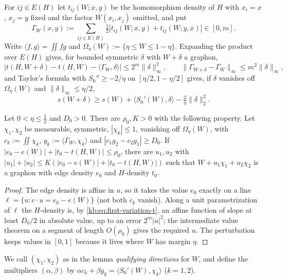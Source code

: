 For $ij\in E(H)$ let $t_{ij}(W;x,y)$ be the homomorphism density of $H$ with
$x_i=x$, $x_j=y$ fixed and the factor $W(x_i,x_j)$ omitted, and put
\[
  \Gamma_W(x,y):=\sum_{ij\in E(H)}\tfrac12\bigl[t_{ij}(W;x,y)+t_{ij}(W;y,x)\bigr]
  \in[0,m].
\]
Write $\langle f,g\rangle=\iint fg$ and $\Omega_\eta(W):=\{\eta\le W\le1-\eta\}$.  Expanding the
product over $E(H)$ gives, for bounded symmetric $\delta$ with $W+\delta$ a graphon,
\begin{equation}\label{kb:eq:first-variation-t}
  \bigl|t(H,W+\delta)-t(H,W)-\langle\Gamma_W,\delta\rangle\bigr|\le 2^m\|\delta\|_\infty^2,
  \qquad
  \|\Gamma_{W+\delta}-\Gamma_W\|_\infty\le m^2\|\delta\|_\infty,
\end{equation}
and Taylor's formula with $S_0''\ge-2/\eta$ on $[\eta/2,1-\eta/2]$ gives, if $\delta$
vanishes off $\Omega_\eta(W)$ and $\|\delta\|_\infty\le\eta/2$,
\begin{equation}\label{kb:eq:first-variation-s}
  s(W+\delta)\ge s(W)+\langle S_0'(W),\delta\rangle-\tfrac2\eta\|\delta\|_2^2 .
\end{equation}

\begin{lemma}\label{kb:lem:correction}
Let $0<\eta\le\frac12$ and $D_0>0$.  There are $\rho_0,K>0$ with the following property.
Let $\chi_1,\chi_2$ be measurable, symmetric, $|\chi_k|\le1$, vanishing off
$\Omega_\eta(W)$, with $c_k:=\iint\chi_k$, $g_k:=\langle\Gamma_W,\chi_k\rangle$ and
$|c_1g_2-c_2g_1|\ge D_0$.  If $|e_0-e(W)|+|t_0-t(H,W)|\le\rho_0$, there are $u_1,u_2$ with
$|u_1|+|u_2|\le K(|e_0-e(W)|+|t_0-t(H,W)|)$ such that $W+u_1\chi_1+u_2\chi_2$ is a graphon
with edge density $e_0$ and $H$-density $t_0$.
\end{lemma}

\begin{proof}
The edge density is affine in $u$, so it takes the value $e_0$ exactly on a line
$\ell=\{u: c\cdot u=e_0-e(W)\}$ (not both $c_k$ vanish).  Along a unit parametrization of $\ell$
the $H$-density is, by \eqref{kb:eq:first-variation-t}, an affine function of slope at least
$D_0/2$ in absolute value, up to an error $2^m|u|^2$; the intermediate value theorem on a
segment of length $O(\rho_0)$ gives the required $u$.  The perturbation keeps values in $[0,1]$
because it lives where $W$ has margin $\eta$.
\end{proof}

We call $(\chi_1,\chi_2)$ as in the lemma \emph{qualifying directions} for $W$, and define
the multipliers $(\alpha,\beta)$ by $\alpha c_k+\beta g_k=\langle S_0'(W),\chi_k\rangle$
($k=1,2$).


